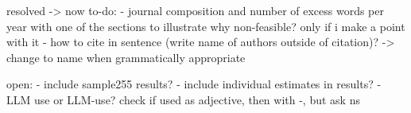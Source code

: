 resolved -> now to-do:
- journal composition and number of excess words per year with one of the sections to illustrate why non-feasible? only if i make a point with it
- how to cite in sentence (write name of authors outside of citation)? -> change to name when grammatically appropriate

open:
- include sample255 results?
- include individual estimates in results?
- LLM use or LLM-use? check if used as adjective, then with -, but ask ns
 
